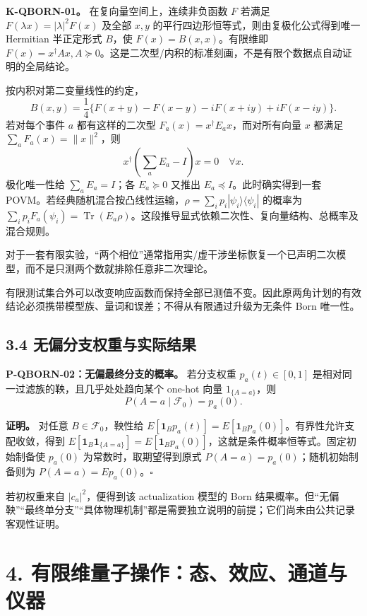 \documentclass[
  11pt,
  oneside]{book}
\begin{document}
\textbf{K-QBORN-01。} 在复向量空间上，连续非负函数 \(F\) 若满足
\(F(\lambda x)=|\lambda|^2F(x)\) 及全部 \(x,y\)
的平行四边形恒等式，则由复极化公式得到唯一 Hermitian 半正定形式
\(B\)，使 \(F(x)=B(x,x)\)。有限维即
\(F(x)=x^\dagger Ax,A\succeq0\)。这是二次型/内积的标准刻画，不是有限个数据点自动证明的全局结论。

按内积对第二变量线性的约定， \[
B(x,y)=\frac14\{F(x+y)-F(x-y)
-iF(x+iy)+iF(x-iy)\}.
\] 若对每个事件 \(a\) 都有这样的二次型
\(F_a(x)=x^\dagger E_ax\)，而对所有向量 \(x\) 都满足
\(\sum_aF_a(x)=\|x\|^2\)，则 \[
x^\dagger\left(\sum_aE_a-I\right)x=0\quad\forall x.
\] 极化唯一性给 \(\sum_aE_a=I\)；各 \(E_a\succeq0\) 又推出
\(E_a\preceq I\)。此时确实得到一套
POVM。若经典随机混合按凸线性运输，\(\rho=\sum_ip_i|\psi_i\rangle\langle\psi_i|\)
的概率为
\(\sum_ip_iF_a(\psi_i)=\operatorname{Tr}(E_a\rho)\)。这段推导显式依赖二次性、复向量结构、总概率及混合规则。

对于一套有限实验，``两个相位''通常指用实/虚干涉坐标恢复一个已声明二次模型，而不是只测两个数就排除任意非二次理论。

有限测试集合外可以改变响应函数而保持全部已测值不变。因此原两角计划的有效结论必须携带模型族、量词和误差；不得从有限通过升级为无条件
Born 唯一性。

\section{3.4 无偏分支权重与实际结果}

\protect\hypertarget{p-qborn-02}{}{}

\textbf{P-QBORN-02：无偏最终分支的概率。} 若分支权重 \(p_a(t)\in[0,1]\)
是相对同一过滤族的鞅，且几乎处处趋向某个 one-hot 向量
\(1_{\{A=a\}}\)，则 \[
P(A=a\mid\mathcal F_0)=p_a(0).
\]

\textbf{证明。} 对任意 \(B\in\mathcal F_0\)，鞅性给
\(E[\mathbf1_Bp_a(t)]=E[\mathbf1_Bp_a(0)]\)。有界性允许支配收敛，得到
\(E[\mathbf1_B\mathbf1_{\{A=a\}}]=E[\mathbf1_Bp_a(0)]\)，这就是条件概率恒等式。固定初始制备使
\(p_a(0)\) 为常数时，取期望得到原式 \(P(A=a)=p_a(0)\)；随机初始制备则为
\(P(A=a)=Ep_a(0)\)。\(\square\)

若初权重来自 \(|c_a|^2\)，便得到该 actualization 模型的 Born
结果概率。但``无偏鞅''``最终单分支''``具体物理机制''都是需要独立说明的前提；它们尚未由公共记录客观性证明。

\chapter{4. 有限维量子操作：态、效应、通道与仪器}\label{ch-4}\hypertarget{ch-4}{}
\end{document}
